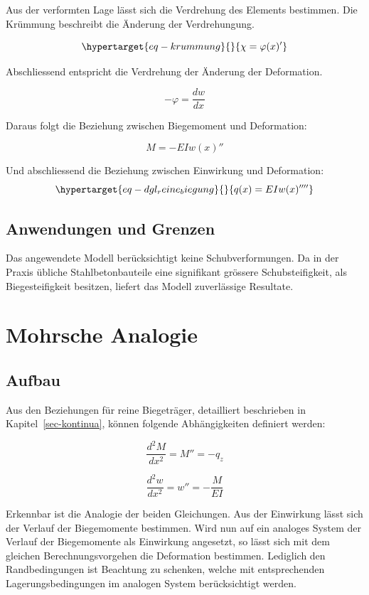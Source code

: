 \documentclass[
  12pt,
  letterpaper,
  egregdoesnotlikesansseriftitles]{scrreprt}
\begin{document}
Aus der verformten Lage lässt sich die Verdrehung des Elements
bestimmen. Die Krümmung beschreibt die Änderung der Verdrehungung.

\begin{equation}\protect\hypertarget{eq-krummung}{}{
\chi = \varphi(x)'
}\label{eq-krummung}\end{equation}

Abschliessend entspricht die Verdrehung der Änderung der Deformation.

\[
-\varphi = \frac{dw}{dx}
\]

Daraus folgt die Beziehung zwischen Biegemoment und Deformation:

\[
M = -EIw(x)''
\]

Und abschliessend die Beziehung zwischen Einwirkung und Deformation:
\begin{equation}\protect\hypertarget{eq-dgl_reine_biegung}{}{
q(x) = EIw(x)''''
}\label{eq-dgl_reine_biegung}\end{equation}

\hypertarget{anwendungen-und-grenzen}{%
\subsection{Anwendungen und Grenzen}\label{anwendungen-und-grenzen}}

Das angewendete Modell berücksichtigt keine Schubverformungen. Da in der
Praxis übliche Stahlbetonbauteile eine signifikant grössere
Schubsteifigkeit, als Biegesteifigkeit besitzen, liefert das Modell
zuverlässige Resultate.

\hypertarget{mohrsche-analogie}{%
\section{Mohrsche Analogie}\label{mohrsche-analogie}}

\hypertarget{aufbau-1}{%
\subsection{Aufbau}\label{aufbau-1}}

Aus den Beziehungen für reine Biegeträger, detailliert beschrieben in
Kapitel~\ref{sec-kontinua}, können folgende Abhängigkeiten definiert
werden:

\[
\frac{d^2M}{dx^2} = M'' = -q_z
\]

\[
\frac{d^2w}{dx^2} = w'' = -\frac{M}{EI}
\]

Erkennbar ist die Analogie der beiden Gleichungen. Aus der Einwirkung
lässt sich der Verlauf der Biegemomente bestimmen. Wird nun auf ein
analoges System der Verlauf der Biegemomente als Einwirkung angesetzt,
so lässt sich mit dem gleichen Berechnungsvorgehen die Deformation
bestimmen. Lediglich den Randbedingungen ist Beachtung zu schenken,
welche mit entsprechenden Lagerungsbedingungen im analogen System
berücksichtigt werden.
\end{document}
